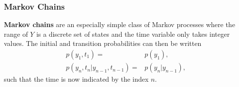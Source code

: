 \documentclass[twoside,english]{uiofysmaster}
\newcommand*\dif{\mathop{}\!\mathrm{d}}
\begin{document}
\begin{comment}
\subsubsection{Stationary processes}
A stochastic process is said to be \textbf{stationary} when
the moments are not affected by a shift in time, that is
\begin{align}
	\langle Y(t_1 + \tau)...Y(t_n + \tau) \rangle = \langle Y(t_1 )...Y(t_n ) \rangle,
\end{align}
for all $n$, all $\tau$, and all $t_1, ..., t_n$.

For a \textbf{stationary Markov process} we have that the transition probability $p_{1|1}$ does not depend on the two times but only on the time interval. We can thus introduce the following notation for the transition probability
\begin{align}
	p_{1|1} (y_2, t_2| y_1, t_1) = T_\tau (y_2|y_1), \quad \tau = t_2 - t_1.
\end{align}

The Chapman-Kolmogorov equation then becomes (for $\tau, \tau' > 0$ )
\begin{align}
	T_{\tau+\tau'} (y_3 | y_2) = \int T_{\tau'} (y_3|y_2) T_\tau (y_2|y_1) \dif y_2.
\end{align}
If we read the integral as a product of two matrices, or integral kernels, this may be written
\begin{align}
	T_{\tau + \tau'} = T_{\tau'} T_{\tau}, \quad (\tau, \tau' > 0).
\end{align}
\end{comment}




\subsubsection{Markov Chains}
\textbf{Markov chains} are an especially simple class of Markov processes where the range of $Y$ is a discrete set of states and the time variable only takes integer values. The initial and transition probabilities can then be written
\begin{align}
	p (y_1, t_1) =& p (y_1), \\
	p (y_n, t_n | y_{n-1}, t_{n-1}) =& p (y_n | y_{n-1}),
\end{align}
such that the time is now indicated by the index $n$.
\end{document}
